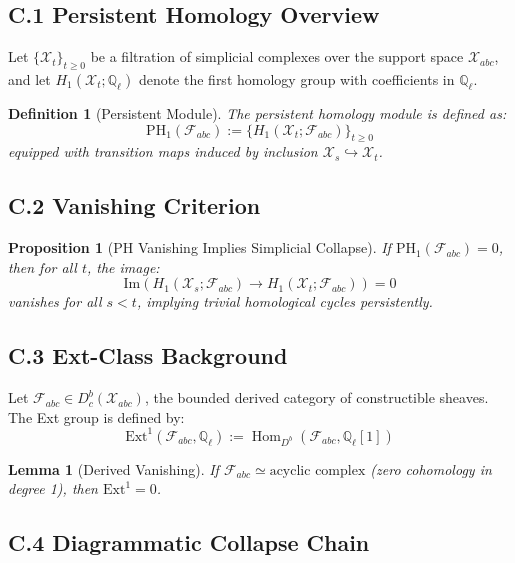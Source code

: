 \documentclass[11pt]{article}
\newtheorem{definition}[theorem]{Definition}
\newtheorem{proposition}[theorem]{Proposition}
\newtheorem{lemma}[theorem]{Lemma}
\begin{document}
\subsection*{C.1 Persistent Homology Overview}

Let \( \{ \mathcal{X}_t \}_{t \geq 0} \) be a filtration of simplicial complexes over the support space \( \mathcal{X}_{abc} \),  
and let \( H_1(\mathcal{X}_t; \mathbb{Q}_\ell) \) denote the first homology group with coefficients in \( \mathbb{Q}_\ell \).

\begin{definition}[Persistent Module]
The persistent homology module is defined as:
\[
\mathrm{PH}_1(\mathcal{F}_{abc}) := \{ H_1(\mathcal{X}_t; \mathcal{F}_{abc}) \}_{t \geq 0}
\]
equipped with transition maps induced by inclusion \( \mathcal{X}_s \hookrightarrow \mathcal{X}_t \).
\end{definition}

\subsection*{C.2 Vanishing Criterion}

\begin{proposition}[PH Vanishing Implies Simplicial Collapse]
If \( \mathrm{PH}_1(\mathcal{F}_{abc}) = 0 \), then for all \( t \), the image:
\[
\mathrm{Im} \left( H_1(\mathcal{X}_s; \mathcal{F}_{abc}) \to H_1(\mathcal{X}_t; \mathcal{F}_{abc}) \right) = 0
\]
vanishes for all \( s < t \), implying trivial homological cycles persistently.
\end{proposition}

\subsection*{C.3 Ext-Class Background}

Let \( \mathcal{F}_{abc} \in D^b_c(\mathcal{X}_{abc}) \), the bounded derived category of constructible sheaves.  
The Ext group is defined by:
\[
\mathrm{Ext}^1(\mathcal{F}_{abc}, \mathbb{Q}_\ell) := \operatorname{Hom}_{D^b}(\mathcal{F}_{abc}, \mathbb{Q}_\ell[1])
\]

\begin{lemma}[Derived Vanishing]
If \( \mathcal{F}_{abc} \simeq \text{acyclic complex} \) (zero cohomology in degree 1), then \( \mathrm{Ext}^1 = 0 \).
\end{lemma}

\subsection*{C.4 Diagrammatic Collapse Chain}
\end{document}
